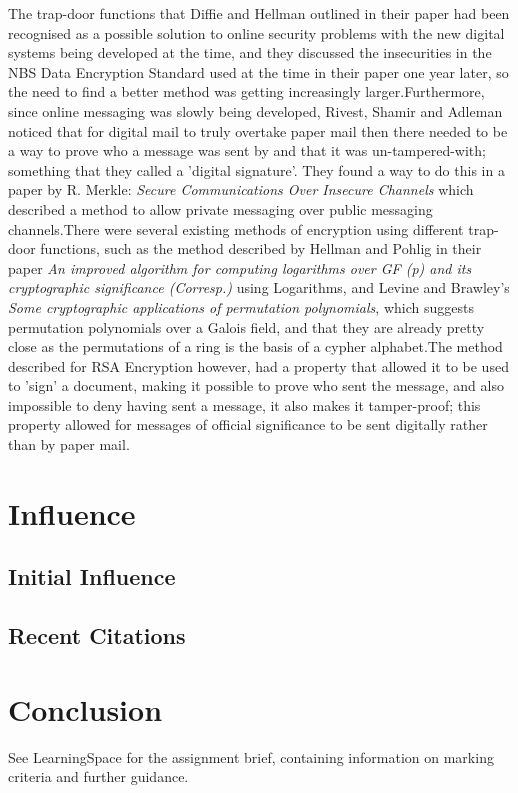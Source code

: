 \documentclass{article}
\begin{document}
The trap-door functions that Diffie and Hellman outlined in their paper\cite{diffie1976new} had been recognised as a possible solution to online security problems with the new digital systems being developed at the time, and they discussed the insecurities in the NBS Data Encryption Standard used at the time in their paper one year later\cite{diffie1977special}, so the need to find a better method was getting increasingly larger.\newline Furthermore, since online messaging was slowly being developed, Rivest, Shamir and Adleman noticed that for digital mail to truly overtake paper mail then there needed to be a way to prove who a message was sent by and that it was un-tampered-with; something that they called a 'digital signature'. They found a way to do this in a paper by R. Merkle: \textit{Secure Communications Over Insecure Channels} which described a method to allow private messaging over public messaging channels\cite{merkle1978secure}.\newline There were several existing methods of encryption using different trap-door functions, such as the method described by Hellman and Pohlig in their paper \textit{An improved algorithm for computing logarithms over GF (p) and its cryptographic significance (Corresp.)}\cite{pohlig1978improved} using Logarithms, and Levine and Brawley's \textit{Some cryptographic applications of permutation polynomials}\cite{levine1977some}, which suggests permutation polynomials over a Galois field, and that they are already pretty close as the permutations of a ring is the basis of a cypher alphabet.\newline The method described for RSA Encryption however, had a property that allowed it to be used to 'sign' a document, making it possible to prove who sent the message, and also impossible to deny having sent a message, it also makes it tamper-proof; this property allowed for messages of official significance to be sent digitally rather than by paper mail.

\section{Influence}
\subsection{Initial Influence}
\subsection{Recent Citations}

\section{Conclusion}

See LearningSpace for the assignment brief, containing information on marking criteria and further guidance.



\end{document}

